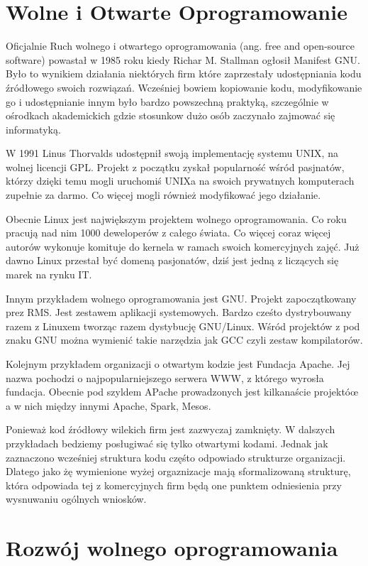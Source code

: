 \documentclass[a4paper,11pt,twoside]{report}
\theoremstyle{definition}
\begin{document}
\section{Wolne i Otwarte Oprogramowanie}

Oficjalnie Ruch wolnego i otwartego oprogramowania (ang. free and open-source 
software) powastał w 1985 roku kiedy Richar M. Stallman ogłosił Manifest 
GNU. Było to wynikiem działania niektórych firm które zaprzestały 
udostępniania kodu źródłowego swoich rozwiązań. Wcześniej bowiem 
kopiowanie kodu, modyfikowanie go i udostępnianie innym było bardzo 
powszechną praktyką, szczególnie w ośrodkach akademickich gdzie stosunkow 
dużo osób zaczynało zajmować się informatyką.

W 1991 Linus Thorvalds udostępnił swoją implementację systemu UNIX, na 
wolnej licencji GPL. Projekt z początku zyskał popularność wśród 
pasjnatów, którzy dzięki temu mogli uruchomiś UNIXa na swoich prywatnych 
komputerach zupełnie za darmo. Co więcej mogli również modyfikować jego 
działanie. 

Obecnie Linux jest największym projektem wolnego oprogramowania. Co roku 
pracują nad nim 1000 deweloperów z całego świata. Co więcej coraz więcej 
autorów wykonuje komituje do kernela w ramach swoich komercyjnych zajęć. 
Już dawno Linux przestał być domeną pasjonatów, dziś jest jedną z 
liczących się marek na rynku IT.

Innym przykładem wolnego oprogramowania jest GNU. Projekt zapoczątkowany prez 
RMS. Jest zestawem aplikacji systemowych. Bardzo cześto dystrybouwany razem z 
Linuxem tworząc razem dystybucję GNU/Linux. Wśród projektów z pod znaku 
GNU można wymienić takie narzędzia jak GCC czyli zestaw kompilatorów.

Kolejnym przykładem organizacji o otwartym kodzie jest Fundacja Apache. Jej 
nazwa pochodzi o najpopularniejszego serwera WWW, z którego wyrosła fundacja. 
Obecnie pod szyldem APache prowadzonych jest kilkanaście projektóœ a w nich 
między innymi Apache, Spark, Mesos. 

Ponieważ kod źródłowy wilekich firm jest zazwyczaj zamknięty. W dalszych 
przykładach bedziemy posługiwać się tylko otwartymi kodami. Jednak jak 
zaznaczono wcześniej struktura kodu częśto odpowiado strukturze organizacji. 
Dlatego jako żę wymienione wyżej orgaznizacje mają sformalizowaną 
strukturę, która odpowiada tej z komercyjnych firm będą one punktem 
odniesienia przy wysnuwaniu ogólnych wniosków.

\section{Rozwój wolnego oprogramowania}
\end{document}
